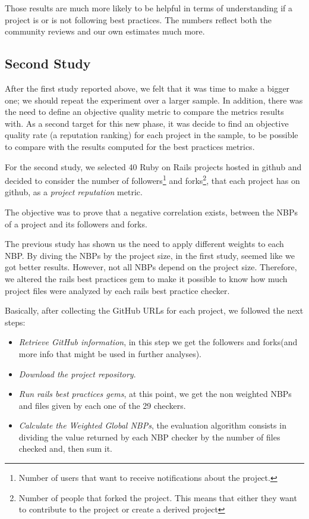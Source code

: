 Those results are much more likely to be helpful in terms of understanding if a project is or is not following 
best practices.
The numbers reflect both the community reviews and our own estimates much more.


\subsection{Second Study}\label{subsec:second_study}
After the first study reported above, we felt that it was time to make a bigger one;
we should repeat the experiment over a larger sample. 
In addition, there was the need to define an objective quality metric to compare the metrics results with.
As a second target for this new phase, it was decide to find an objective quality rate (a reputation ranking) for each project in the sample, 
to be possible to compare with the results computed for the best practices metrics.

For the second study, we selected 40 Ruby on Rails projects hosted in github and
decided to consider the number of 
\textsf{followers}\footnote{Number of users that want to receive notifications about the project.} and
\textsf{forks}\footnote{Number of people that forked the project. This means that either they want to contribute to the project or create a derived project}, 
that each project has on github, 
as a \emph{project reputation} metric. 

The objective was to prove that a negative correlation exists, between the NBPs of a project and its followers and forks. 

The previous study has shown us the need to apply different weights to each NBP. 
By diving the NBPs by the project size, in the first study, seemed like we got better results.
However, not all NBPs depend on the project size. 
Therefore, we altered the rails best practices gem to make it possible to know how much project files were analyzed 
by each rails best practice checker.

Basically, after collecting the GitHub URLs for each project, we followed the next steps:
\begin{itemize}
\item \emph{Retrieve GitHub information}, in this step we get the followers and forks(and more info that might be used in further analyses).
\item \emph{Download the project repository}.
\item \emph{Run rails best practices gems}, at this point, we get the non weighted NBPs and files given by each one of the 29 checkers.
\item \emph{Calculate the Weighted Global NBPs}, the evaluation algorithm consists in dividing the value returned by each NBP checker  by the number of files checked and, then sum it.
\end{itemize}

